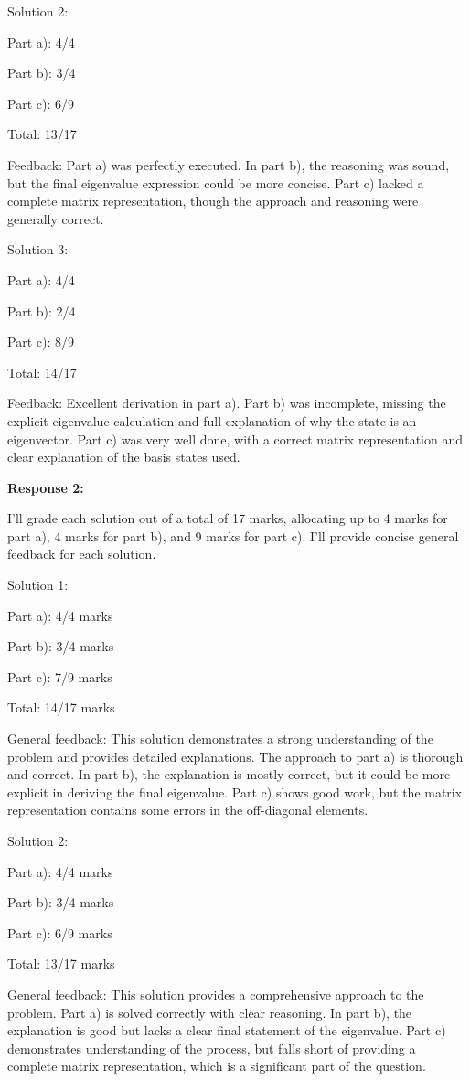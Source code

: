 \documentclass[a4paper,11pt]{article}
\begin{document}
Solution 2:

Part a): 4/4

Part b): 3/4

Part c): 6/9

Total: 13/17

Feedback: Part a) was perfectly executed. In part b), the reasoning was sound, but the final eigenvalue expression could be more concise. Part c) lacked a complete matrix representation, though the approach and reasoning were generally correct.

Solution 3:

Part a): 4/4

Part b): 2/4

Part c): 8/9

Total: 14/17

Feedback: Excellent derivation in part a). Part b) was incomplete, missing the explicit eigenvalue calculation and full explanation of why the state is an eigenvector. Part c) was very well done, with a correct matrix representation and clear explanation of the basis states used.

\bigskip
\textbf{Response 2:}

I'll grade each solution out of a total of 17 marks, allocating up to 4 marks for part a), 4 marks for part b), and 9 marks for part c). I'll provide concise general feedback for each solution.

Solution 1:

Part a): 4/4 marks

Part b): 3/4 marks

Part c): 7/9 marks

Total: 14/17 marks

General feedback: This solution demonstrates a strong understanding of the problem and provides detailed explanations. The approach to part a) is thorough and correct. In part b), the explanation is mostly correct, but it could be more explicit in deriving the final eigenvalue. Part c) shows good work, but the matrix representation contains some errors in the off-diagonal elements.

Solution 2:

Part a): 4/4 marks

Part b): 3/4 marks

Part c): 6/9 marks

Total: 13/17 marks

General feedback: This solution provides a comprehensive approach to the problem. Part a) is solved correctly with clear reasoning. In part b), the explanation is good but lacks a clear final statement of the eigenvalue. Part c) demonstrates understanding of the process, but falls short of providing a complete matrix representation, which is a significant part of the question.
\end{document}
